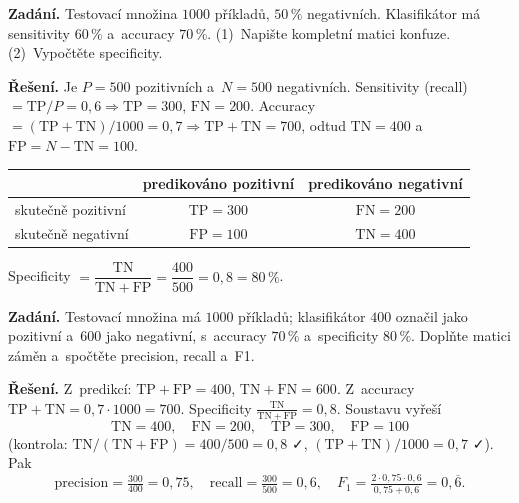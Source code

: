 \begin{priklad}
\par
\textbf{Zadání.} Testovací množina $1000$ příkladů, $50\,\%$ negativních. Klasifikátor má sensitivity $60\,\%$ a~accuracy $70\,\%$. (1)~Napište kompletní matici konfuze. (2)~Vypočtěte specificity.

\smallskip
\textbf{Řešení.} Je $P=500$ pozitivních a~$N=500$ negativních. Sensitivity (recall) $=\mathrm{TP}/P=0{,}6\Rightarrow\mathrm{TP}=300$, $\mathrm{FN}=200$. Accuracy $=(\mathrm{TP}+\mathrm{TN})/1000=0{,}7\Rightarrow\mathrm{TP}+\mathrm{TN}=700$, odtud $\mathrm{TN}=400$ a~$\mathrm{FP}=N-\mathrm{TN}=100$.
\begin{center}
\begin{tabular}{lcc}
\toprule
& predikováno pozitivní & predikováno negativní \\
\midrule
skutečně pozitivní & $\mathrm{TP}=300$ & $\mathrm{FN}=200$ \\
skutečně negativní & $\mathrm{FP}=100$ & $\mathrm{TN}=400$ \\
\bottomrule
\end{tabular}
\end{center}
Specificity $=\dfrac{\mathrm{TN}}{\mathrm{TN}+\mathrm{FP}}=\dfrac{400}{500}=\boxed{0{,}8}=80\,\%$.
\end{priklad}

\begin{priklad}
\par
\textbf{Zadání.} Testovací množina má $1000$ příkladů; klasifikátor $400$ označil jako pozitivní a~$600$ jako negativní, s~accuracy $70\,\%$ a~specificity $80\,\%$. Doplňte matici záměn a~spočtěte precision, recall a~F1.

\smallskip
\textbf{Řešení.} Z~predikcí: $\mathrm{TP}+\mathrm{FP}=400$, $\mathrm{TN}+\mathrm{FN}=600$. Z~accuracy $\mathrm{TP}+\mathrm{TN}=0{,}7\cdot 1000=700$. Specificity $\frac{\mathrm{TN}}{\mathrm{TN}+\mathrm{FP}}=0{,}8$. Soustavu vyřeší
\[ \mathrm{TN}=400,\quad \mathrm{FN}=200,\quad \mathrm{TP}=300,\quad \mathrm{FP}=100 \]
(kontrola: $\mathrm{TN}/(\mathrm{TN}+\mathrm{FP})=400/500=0{,}8$ \faCheck, $(\mathrm{TP}+\mathrm{TN})/1000=0{,}7$ \faCheck). Pak
\[ \text{precision}=\tfrac{300}{400}=\boxed{0{,}75},\quad \text{recall}=\tfrac{300}{500}=\boxed{0{,}6},\quad F_1=\tfrac{2\cdot 0{,}75\cdot 0{,}6}{0{,}75+0{,}6}=\boxed{0{,}\overline{6}}. \]
\end{priklad}

